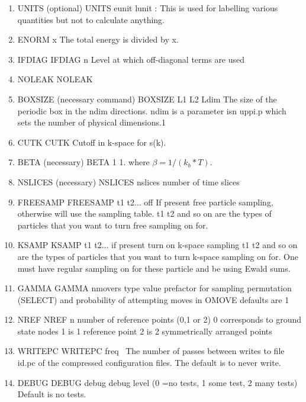 \begin{enumerate}

\item UNITS (optional)
\bv
UNITS eunit lunit : 
\ev
This is used for labelling various quantities but not to calculate
anything.
 
\item
  
\bv
     ENORM    x
\ev
The total energy is divided by x.
\item IFDIAG
\bv
     IFDIAG   n
\ev
Level at which off-diagonal terms are used
\item NOLEAK
\bv
     NOLEAK   
\ev
\item BOXSIZE (necessary command)
\ev
     BOXSIZE  L1 L2 Ldim
\ev
The size of the periodic box in the ndim  directions. ndim is a parameter
isn uppi.p which sets the number of physical dimensions.1
\item CUTK
\bv
     CUTK    
\ev
Cutoff in k-space for s(k).
\item BETA (necessary)
\bv
BETA     1  1.        
\ev    
where $\beta =1/(k_b*T) $.
\item NSLICES (necessary)
\bv
     NSLICES  nslices 
\ev
 number of time slices
\item FREESAMP
\bv
     FREESAMP t1 t2...  off 
\ev
If present free particle sampling, otherwise  will use the
sampling table. t1 t2 and so on are the types of particles
that you want to turn free sampling on for.
\item KSAMP
\bv
     KSAMP t1 t2... 
\ev
if present turn on k-space sampling
t1 t2 and so on are the types of particles
that you want to turn k-space sampling on for.
One must have regular sampling on for these particle and be using Ewald
sums.
\item GAMMA
\bv
     GAMMA   nmovers type value 
\ev
 prefactor for sampling permutation (SELECT) and probability 
of attempting moves in OMOVE defaults are 1
\item NREF
\bv
     NREF   n 
\ev
 number of reference points (0,1 or 2)
            0 corresponds to ground state nodes
            1 is 1 reference point
            2 is 2 symmetrically arranged points
\item WRITEPC
\bv
     WRITEPC  freq
\
The number of passes between writes to file id.pc
of the compressed configuration files. The default is to never write.
\item DEBUG
\bv
DEBUG   debug 
\ev
debug level (0 =no tests, 1 some test, 2 many tests)
Default is no tests.


\end{enumerate}
